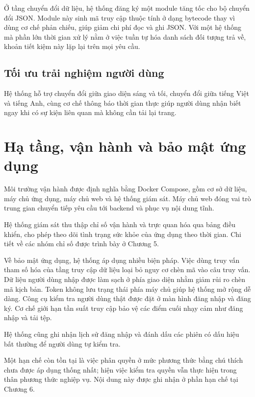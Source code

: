 \documentclass[12pt,a4paper,oneside]{report}
\begin{document}
Ở tầng chuyển đổi dữ liệu, hệ thống đăng ký một module tăng tốc cho bộ chuyển đổi JSON. Module này sinh mã truy cập thuộc tính ở dạng bytecode thay vì dùng cơ chế phản chiếu, giúp giảm chi phí đọc và ghi JSON. Với một hệ thống mà phần lớn thời gian xử lý nằm ở việc tuần tự hóa danh sách đối tượng trả về, khoản tiết kiệm này lặp lại trên mọi yêu cầu.

\subsection{Tối ưu trải nghiệm người dùng}

Hệ thống hỗ trợ chuyển đổi giữa giao diện sáng và tối, chuyển đổi giữa tiếng Việt và tiếng Anh, cùng cơ chế thông báo thời gian thực giúp người dùng nhận biết ngay khi có sự kiện liên quan mà không cần tải lại trang.

\section{Hạ tầng, vận hành và bảo mật ứng dụng}

Môi trường vận hành được định nghĩa bằng Docker Compose, gồm cơ sở dữ liệu, máy chủ ứng dụng, máy chủ web và hệ thống giám sát. Máy chủ web đóng vai trò trung gian chuyển tiếp yêu cầu tới backend và phục vụ nội dung tĩnh.

Hệ thống giám sát thu thập chỉ số vận hành và trực quan hóa qua bảng điều khiển, cho phép theo dõi tình trạng sức khỏe của ứng dụng theo thời gian. Chi tiết về các nhóm chỉ số được trình bày ở Chương 5.

Về bảo mật ứng dụng, hệ thống áp dụng nhiều biện pháp. Việc dùng truy vấn tham số hóa của tầng truy cập dữ liệu loại bỏ nguy cơ chèn mã vào câu truy vấn. Dữ liệu người dùng nhập được làm sạch ở phía giao diện nhằm giảm rủi ro chèn mã kịch bản. Token không lưu trạng thái phía máy chủ giúp hệ thống mở rộng dễ dàng. Công cụ kiểm tra người dùng thật được đặt ở màn hình đăng nhập và đăng ký. Cơ chế giới hạn tần suất truy cập bảo vệ các điểm cuối nhạy cảm như đăng nhập và tải tệp.

Hệ thống cũng ghi nhận lịch sử đăng nhập và đánh dấu các phiên có dấu hiệu bất thường để người dùng tự kiểm tra.

Một hạn chế còn tồn tại là việc phân quyền ở mức phương thức bằng chú thích chưa được áp dụng thống nhất; hiện việc kiểm tra quyền vẫn thực hiện trong thân phương thức nghiệp vụ. Nội dung này được ghi nhận ở phần hạn chế tại Chương 6.
\end{document}
